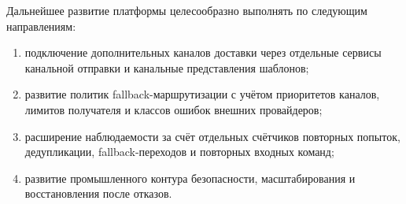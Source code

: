 Дальнейшее развитие платформы целесообразно выполнять по следующим направлениям:
\begin{enumerate}
    \item подключение дополнительных каналов доставки через отдельные сервисы канальной отправки и канальные представления шаблонов;
    \item развитие политик fallback-маршрутизации с учётом приоритетов каналов, лимитов получателя и классов ошибок внешних провайдеров;
    \item расширение наблюдаемости за счёт отдельных счётчиков повторных попыток, дедупликации, fallback-переходов и повторных входных команд;
    \item развитие промышленного контура безопасности, масштабирования и восстановления после отказов.
\end{enumerate}
